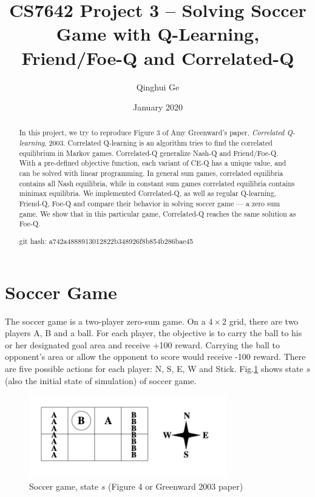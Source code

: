 \documentclass[conference]{IEEEtran}
\title{CS7642 Project 3 -- Solving Soccer Game with Q-Learning, Friend/Foe-Q and Correlated-Q}
\author{Qinghui Ge}
\date{January 2020}
\begin{document}
	
	\maketitle
	
\begin{abstract}
In this project, we try to reproduce Figure 3 of Amy Greenward's paper, \textit{Correlated Q-learning}, 2003\cite{greenwald2003correlated}.  Correlated Q-learning is an algorithm tries to find the correlated equilibrium in Markov games. Correlated-Q generalize Nash-Q and Friend/Foe-Q. With a pre-defined objective function, each variant of CE-Q has a unique value, and can be solved with linear programming. In general sum games, correlated equilibria contains all Nash equilibria, while in constant sum games correlated equilibria contains minimax equilibria. We implemented Correlated-Q, as well as regular Q-learning, Friend-Q, Foe-Q and compare their behavior in solving soccer game --- a zero sum game. We show that in this particular game, Correlated-Q reaches the same solution as Foe-Q.

	git hash: a742a4888913012822b348926f8b854b286bae45
\end{abstract}
	
	
\section{Soccer Game}
The soccer game is a two-player zero-sum game. On a $4\times2$ grid, there are two players A, B and a ball. For each player, the objective is to carry the ball to his or her designated goal area and receive +100 reward. Carrying the ball to opponent's area or allow the opponent to score would receive -100 reward. There are five possible actions for each player: N, S, E, W and Stick. Fig.\ref{fig:state_s} shows state $s$ (also the initial state of simulation) of soccer game.

\begin{figure}[!h]
	\centering
	\includegraphics[width=3.4in]{figures/state_s}
	\caption{Soccer game, state $s$ (Figure 4 or Greenward 2003 paper\cite{greenwald2003correlated})}
	\label{fig:state_s}
\end{figure}
\end{document}
